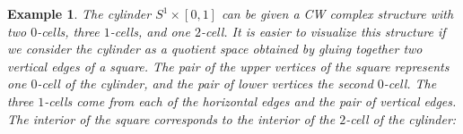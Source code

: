 \documentclass[11pt, letterpaper, oneside]{report}
\theoremstyle{pplain}
\theoremstyle{ddefinition}
\newtheorem{example}[theorem]{Example}
\theoremstyle{nnn}
\theoremstyle{eexercise}
\begin{document}
\begin{example}
The cylinder $S^{1}\times [0, 1]$ can be given a CW complex structure with two $0$-cells, 
three $1$-cells, and one $2$-cell. It is easier to visualize this structure if we consider the cylinder 
as a quotient space obtained by gluing together two vertical edges of a square. The pair 
of the upper vertices of the square represents one $0$-cell of the cylinder, and the  pair of lower vertices 
the second  $0$-cell. The three $1$-cells come from each of the  horizontal edges and the pair of vertical 
edges. The interior of the square corresponds to the interior of the $2$-cell of the cylinder:   

\end{example}
\end{document}
